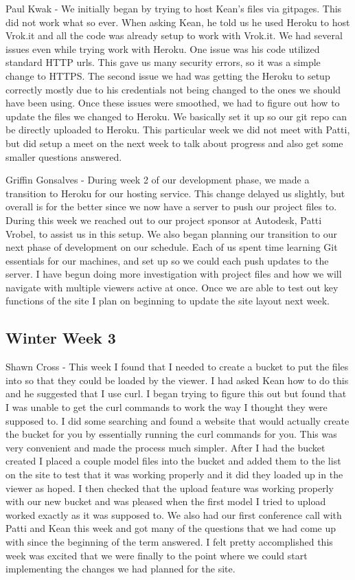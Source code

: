 \documentclass[10pt,draftclsnofoot,onecolumn]{IEEEtran}
\begin{document}
Paul Kwak - We initially began by trying to host Kean's files via gitpages. This did not work what so ever. When asking Kean, he told us he used Heroku to host Vrok.it and all the code was already setup to work with Vrok.it. We had several issues even while trying work with Heroku. One issue was his code utilized standard HTTP urls. This gave us many security errors, so it was a simple change to HTTPS. The second issue we had was getting the Heroku to setup correctly mostly due to his credentials not being changed to the ones we should have been using. Once these issues were smoothed, we had to figure out how to update the files we changed to Heroku. We basically set it up so our git repo can be directly uploaded to Heroku. This particular week we did not meet with Patti, but did setup a meet on the next week to talk about progress and also get some smaller questions answered.

Griffin Gonsalves - During week 2 of our development phase, we made a transition to Heroku for our hosting service. This change delayed us slightly, but overall is for the better since we now have a server to push our project files to. During this week we reached out to our project sponsor at Autodesk, Patti Vrobel, to assist us in this setup. We also began planning our transition to our next phase of development on our schedule. Each of us spent time learning Git essentials for our machines, and set up so we could each push updates to the server. I have begun doing more investigation with project files and how we will navigate with multiple viewers active at once. Once we are able to test out key functions of the site I plan on beginning to update the site layout next week.
\subsection{Winter Week 3}
Shawn Cross - This week I found that I needed to create a bucket to put the files into so that they could be loaded by the viewer. I had asked Kean how to do this and he suggested that I use curl. I began trying to figure this out but found that I was unable to get the curl commands to work the way I thought they were supposed to. I did some searching and found a website that would actually create the bucket for you by essentially running the curl commands for you. This was very convenient and made the process much simpler. After I had the bucket created I placed a couple model files into the bucket and added them to the list on the site to test that it was working properly and it did they loaded up in the viewer as hoped. I then checked that the upload feature was working properly with our new bucket and was pleased when the first model I tried to upload worked exactly as it was supposed to. We also had our first conference call with Patti and Kean this week and got many of the questions that we had come up with since the beginning of the term answered. I felt pretty accomplished this week was excited that we were finally to the point where we could start implementing the changes we had planned for the site.
\end{document}
